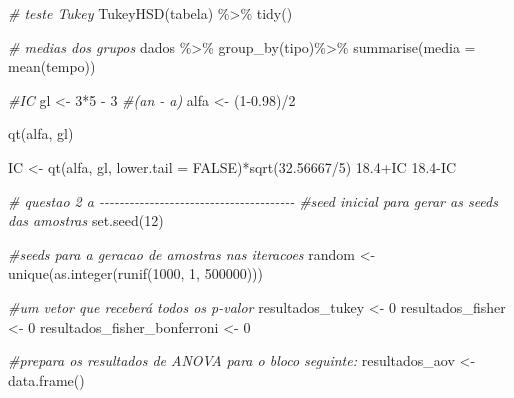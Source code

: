 \documentclass[
]{article}
\newenvironment{Shaded}{\begin{snugshade}}{\end{snugshade}}
\newcommand{\AttributeTok}[1]{\textcolor[rgb]{0.77,0.63,0.00}{#1}}
\newcommand{\CommentTok}[1]{\textcolor[rgb]{0.56,0.35,0.01}{\textit{#1}}}
\newcommand{\ConstantTok}[1]{\textcolor[rgb]{0.00,0.00,0.00}{#1}}
\newcommand{\DecValTok}[1]{\textcolor[rgb]{0.00,0.00,0.81}{#1}}
\newcommand{\FloatTok}[1]{\textcolor[rgb]{0.00,0.00,0.81}{#1}}
\newcommand{\FunctionTok}[1]{\textcolor[rgb]{0.00,0.00,0.00}{#1}}
\newcommand{\NormalTok}[1]{#1}
\newcommand{\OtherTok}[1]{\textcolor[rgb]{0.56,0.35,0.01}{#1}}
\newcommand{\SpecialCharTok}[1]{\textcolor[rgb]{0.00,0.00,0.00}{#1}}
\begin{document}
\begin{Shaded}
\begin{Highlighting}[]
\CommentTok{\# teste Tukey}
\FunctionTok{TukeyHSD}\NormalTok{(tabela) }\SpecialCharTok{\%\textgreater{}\%} 
    \FunctionTok{tidy}\NormalTok{()}

\CommentTok{\# medias dos grupos}
\NormalTok{dados }\SpecialCharTok{\%\textgreater{}\%}
    \FunctionTok{group\_by}\NormalTok{(tipo)}\SpecialCharTok{\%\textgreater{}\%}
    \FunctionTok{summarise}\NormalTok{(}\AttributeTok{media =} \FunctionTok{mean}\NormalTok{(tempo))}

\CommentTok{\#IC}
\NormalTok{gl }\OtherTok{\textless{}{-}} \DecValTok{3}\SpecialCharTok{*}\DecValTok{5} \SpecialCharTok{{-}} \DecValTok{3} \CommentTok{\#(an {-} a)}
\NormalTok{alfa }\OtherTok{\textless{}{-}}\NormalTok{ (}\DecValTok{1}\FloatTok{{-}0.98}\NormalTok{)}\SpecialCharTok{/}\DecValTok{2}

\FunctionTok{qt}\NormalTok{(alfa, gl)}

\NormalTok{IC }\OtherTok{\textless{}{-}} \FunctionTok{qt}\NormalTok{(alfa, gl, }\AttributeTok{lower.tail =} \ConstantTok{FALSE}\NormalTok{)}\SpecialCharTok{*}\FunctionTok{sqrt}\NormalTok{(}\FloatTok{32.56667}\SpecialCharTok{/}\DecValTok{5}\NormalTok{)}
\FloatTok{18.4}\SpecialCharTok{+}\NormalTok{IC}
\FloatTok{18.4}\SpecialCharTok{{-}}\NormalTok{IC}

\CommentTok{\# questao 2 a {-}{-}{-}{-}{-}{-}{-}{-}{-}{-}{-}{-}{-}{-}{-}{-}{-}{-}{-}{-}{-}{-}{-}{-}{-}{-}{-}{-}{-}{-}{-}{-}{-}{-}{-}{-}{-}{-}{-}}
\CommentTok{\#seed inicial para gerar as seeds das amostras}
\FunctionTok{set.seed}\NormalTok{(}\DecValTok{12}\NormalTok{)}

\CommentTok{\#seeds para a geracao de amostras nas iteracoes}
\NormalTok{random }\OtherTok{\textless{}{-}} \FunctionTok{unique}\NormalTok{(}\FunctionTok{as.integer}\NormalTok{(}\FunctionTok{runif}\NormalTok{(}\DecValTok{1000}\NormalTok{, }\DecValTok{1}\NormalTok{, }\DecValTok{500000}\NormalTok{)))}

\CommentTok{\#um vetor que receberá todos os p{-}valor}
\NormalTok{resultados\_tukey }\OtherTok{\textless{}{-}} \DecValTok{0}
\NormalTok{resultados\_fisher }\OtherTok{\textless{}{-}} \DecValTok{0}
\NormalTok{resultados\_fisher\_bonferroni }\OtherTok{\textless{}{-}} \DecValTok{0}

\CommentTok{\#prepara os resultados de ANOVA para o bloco seguinte:}
\NormalTok{resultados\_aov }\OtherTok{\textless{}{-}} \FunctionTok{data.frame}\NormalTok{()}


\end{Highlighting}
\end{Shaded}
\end{document}
